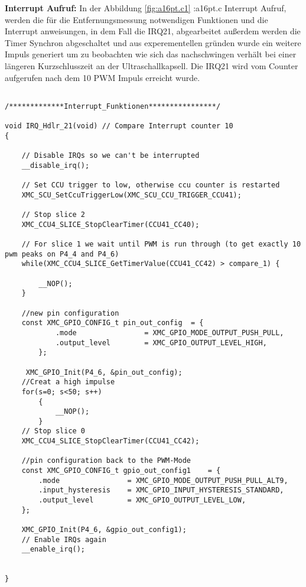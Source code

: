 \textbf{Interrupt Aufruf:}
In der Abbildung \ref{fig:a16pt.c1} :a16pt.c Interrupt Aufruf, werden die für die Entfernungsmessung notwendigen Funktionen und die Interrupt anweisungen, in dem Fall die IRQ21, abgearbeitet außerdem werden die Timer Synchron abgeschaltet und aus experementellen gründen wurde ein weitere Impuls generiert um zu beobachten wie sich das nachschwingen verhält bei einer längeren Kurzschlusszeit an der Ultraschallkapsell. Die IRQ21 wird vom Counter aufgerufen nach dem 10 PWM Impuls erreicht wurde.
\\
\begin{minipage}{1\textwidth}
\begin{lstlisting}

/*************Interrupt_Funktionen****************/

void IRQ_Hdlr_21(void) // Compare Interrupt counter 10
{

	// Disable IRQs so we can't be interrupted
	__disable_irq();

	// Set CCU trigger to low, otherwise ccu counter is restarted
	XMC_SCU_SetCcuTriggerLow(XMC_SCU_CCU_TRIGGER_CCU41);

	// Stop slice 2
	XMC_CCU4_SLICE_StopClearTimer(CCU41_CC40);

	// For slice 1 we wait until PWM is run through (to get exactly 10 pwm peaks on P4_4 and P4_6)
	while(XMC_CCU4_SLICE_GetTimerValue(CCU41_CC42) > compare_1) {

		__NOP();
	}
	
	//new pin configuration
	const XMC_GPIO_CONFIG_t pin_out_config	= {
			.mode                = XMC_GPIO_MODE_OUTPUT_PUSH_PULL,
			.output_level        = XMC_GPIO_OUTPUT_LEVEL_HIGH,
		};

	 XMC_GPIO_Init(P4_6, &pin_out_config);
	//Creat a high impulse
	for(s=0; s<50; s++)
		{
			__NOP();
		}
	// Stop slice 0
	XMC_CCU4_SLICE_StopClearTimer(CCU41_CC42);
	
	//pin configuration back to the PWM-Mode
	const XMC_GPIO_CONFIG_t gpio_out_config1	= {
		.mode                = XMC_GPIO_MODE_OUTPUT_PUSH_PULL_ALT9,
		.input_hysteresis    = XMC_GPIO_INPUT_HYSTERESIS_STANDARD,
		.output_level        = XMC_GPIO_OUTPUT_LEVEL_LOW,
	};

	XMC_GPIO_Init(P4_6, &gpio_out_config1);
	// Enable IRQs again
	__enable_irq();


}
\end{lstlisting}
\label{fig:a16pt.c1}
\end{minipage}

